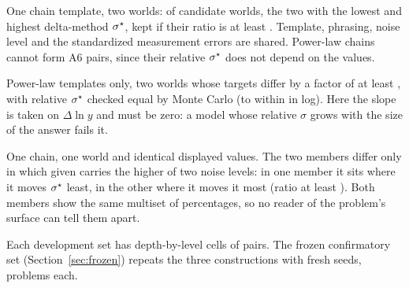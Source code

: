 \begin{description}[leftmargin=0pt, itemsep=2pt]
\item[A6 (value changes).] One chain template, two worlds: of  candidate worlds, the two with
  the lowest and highest delta-method $\sigma^{\star}$, kept if their ratio is at least .
  Template, phrasing, noise level and the standardized measurement errors are shared.
  Power-law chains cannot form A6 pairs, since their relative $\sigma^{\star}$ does not depend on the values.
\item[A6b (invariance).] Power-law templates only, two worlds whose targets differ by a factor of at least
  , with relative $\sigma^{\star}$ checked equal by Monte Carlo (to within  in
  log).
  Here the slope is taken on $\Delta\ln y$ and must be zero: a model whose relative $\sigma$ grows with the size of
  the answer fails it.
\item[A6c (noise allocation).] One chain, one world and identical displayed values.
  The two members differ only in which given carries the higher of two noise levels: in one member it sits where it
  moves $\sigma^{\star}$ least, in the other where it moves it most (ratio at least ).
  Both members show the same multiset of percentages, so no reader of the problem's surface can tell them apart.
\end{description}

Each development set has  depth-by-level cells of  pairs.
The frozen confirmatory set (Section~\ref{sec:frozen}) repeats the three constructions with fresh seeds,
 problems each.

